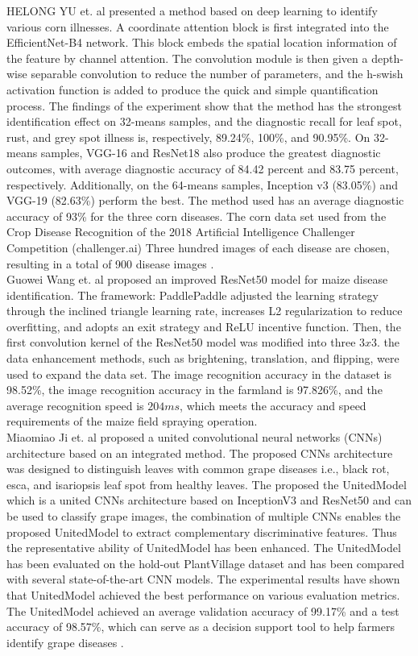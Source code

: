 HELONG YU et. al presented a method based on deep learning to identify various 
corn illnesses. A coordinate attention block is first integrated into the 
EfficientNet-B4 network. This block embeds the spatial location information of the 
feature by channel attention. The convolution module is then given a depth-wise 
separable convolution to reduce the number of parameters, and the h-swish 
activation function is added to produce the quick and simple quantification process. 
The findings of the experiment show that the method has the strongest identification 
effect on 32-means samples, and the diagnostic recall for leaf spot, rust, and grey 
spot illness is, respectively, 89.24\%, 100\%, and 90.95\%. On 32-means samples, VGG-16 
and ResNet18 also produce the greatest diagnostic outcomes, with average diagnostic 
accuracy of 84.42 percent and 83.75 percent, respectively. Additionally, on the 64-means 
samples, Inception v3 (83.05\%) and VGG-19 (82.63\%) perform the best. The method used has 
an average diagnostic accuracy of 93\% for the three corn diseases. The corn data set used 
from the Crop Disease Recognition of the 2018 Artificial Intelligence Challenger Competition 
(challenger.ai) Three hundred images of each disease are chosen, resulting in a total of 900 
disease images \cite{yu21}. \\

Guowei Wang et. al proposed an improved ResNet50 model for maize disease 
identification. The framework: PaddlePaddle adjusted the learning strategy 
through the inclined triangle learning rate, increases L2 regularization to 
reduce overfitting, and adopts an exit strategy and ReLU incentive function. Then, 
the first convolution kernel of the ResNet50 model was modified into three $3 x 3$. 
the data enhancement methods, such as brightening, translation, and flipping, were 
used to expand the data set. The image recognition accuracy in the dataset is 
98.52\%, the image recognition accuracy in the farmland is 97.826\%, and the 
average recognition speed is $204ms$, which meets the accuracy and speed requirements 
of the maize field spraying operation\cite{wan2_21}. \\

Miaomiao Ji et. al proposed a united convolutional neural networks 
(CNNs) architecture based on an integrated method. The proposed CNNs 
architecture was designed to distinguish leaves with common grape 
diseases i.e., black rot, esca, and isariopsis leaf spot from healthy leaves. 
The proposed the UnitedModel which is a united CNNs architecture based on 
InceptionV3 and ResNet50 and can be used to classify grape images, the combination of 
multiple CNNs enables the proposed UnitedModel to extract complementary discriminative 
features. Thus the representative ability of UnitedModel has been enhanced. The 
UnitedModel has been evaluated on the hold-out PlantVillage dataset and has been 
compared with several state-of-the-art CNN models. The experimental results have 
shown that UnitedModel achieved the best performance on various evaluation metrics. The 
UnitedModel achieved an average validation accuracy of 99.17\% and a test accuracy of 
98.57\%, which can serve as a decision support tool to help 
farmers identify grape diseases \cite{ji20}.

